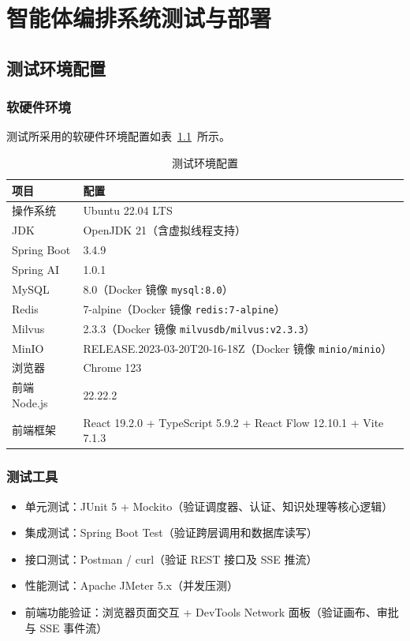 
\chapter{智能体编排系统测试与部署}

\section{测试环境配置}

\subsection{软硬件环境}

测试所采用的软硬件环境配置如表~\ref{tab:test_env}~所示。

\begin{table}[H]
  \centering
  \caption{测试环境配置}
  \small
  \begin{tabularx}{\textwidth}{p{3.0cm}X}
    \toprule
    项目 & 配置 \\
    \midrule
    操作系统 & Ubuntu 22.04 LTS \\
    JDK & OpenJDK 21（含虚拟线程支持） \\
    Spring Boot & 3.4.9 \\
    Spring AI & 1.0.1 \\
    MySQL & 8.0（Docker 镜像 \texttt{mysql:8.0}） \\
    Redis & 7-alpine（Docker 镜像 \texttt{redis:7-alpine}） \\
    Milvus & 2.3.3（Docker 镜像 \texttt{milvusdb/milvus:v2.3.3}） \\
    MinIO & RELEASE.2023-03-20T20-16-18Z（Docker 镜像 \texttt{minio/minio}） \\
    浏览器 & Chrome 123 \\
    前端 Node.js & 22.22.2 \\
    前端框架 & React 19.2.0 + TypeScript 5.9.2 + React Flow 12.10.1 + Vite 7.1.3 \\
    \bottomrule
  \end{tabularx}
  \label{tab:test_env}
\end{table}

\subsection{测试工具}

\begin{itemize}
  \item 单元测试：JUnit 5 + Mockito（验证调度器、认证、知识处理等核心逻辑）
  \item 集成测试：Spring Boot Test（验证跨层调用和数据库读写）
  \item 接口测试：Postman / curl（验证 REST 接口及 SSE 推流）
  \item 性能测试：Apache JMeter 5.x（并发压测）
  \item 前端功能验证：浏览器页面交互 + DevTools Network 面板（验证画布、审批与 SSE 事件流）
\end{itemize}

